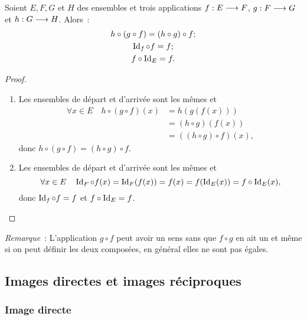 \begin{prop}
    Soient \(E, F, G\) et \(H\) des ensembles et trois applications 
    \(f:E \longrightarrow F\), \(g:F \longrightarrow G\) et \(h:G \longrightarrow H\). 
    Alors~:
    \begin{gather}
        h \circ (g \circ f) = (h \circ g) \circ f;\\
        \operatorname{Id}_f \circ f = f;\\
        f \circ \operatorname{Id}_E = f.
    \end{gather}
\end{prop}

\begin{proof}
    \begin{enumerate}
        \item Les ensembles de départ et d'arrivée sont les mêmes et 
            \begin{align*}
                \forall x \in E \quad h \circ (g \circ f)(x) & = h(g(f(x))) \\
                                             & = (h \circ g)(f(x))\\
                                             & = ((h \circ g) \circ f)(x),
            \end{align*}
            donc \(h \circ (g \circ f) = (h \circ g) \circ f\).
        \item Les ensembles de départ et d'arrivée sont les mêmes et 
            \begin{equation*}
                \forall x \in E \quad \operatorname{Id}_F \circ 
                f(x) = \operatorname{Id}_F(f(x)) = f(x) = f(\operatorname{Id}_E(x)) = f \circ \operatorname{Id}_E(x),
            \end{equation*}
            donc \(\operatorname{Id}_f \circ f = f\) et \(f \circ \operatorname{Id}_E = f\).
    \end{enumerate}
\end{proof}

\emph{Remarque}~: L'application \(g \circ f\) peut avoir un sens sans que \(f 
\circ g\) en ait un et même si on peut définir les deux composées, en général 
elles ne sont pas égales.

\subsection{Images directes et images réciproques}
\label{chap3-subsec:imagesdirecteetrec}

\subsubsection{Image directe}
\label{chap3-subsec:imagedirecte}

